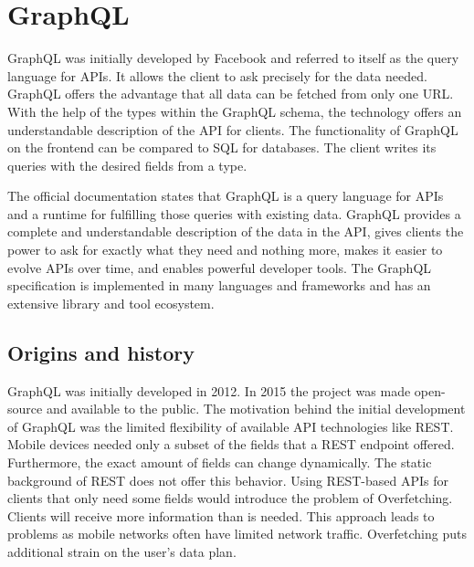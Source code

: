 \section{GraphQL}\label{section:background:graphql}

GraphQL was initially developed by Facebook and referred to itself as the query language for APIs. It allows the client to ask precisely for the data needed. GraphQL offers the advantage that all data can be fetched from only one \ac{URL}. With the help of the types within the GraphQL schema, the technology offers an understandable description of the \ac{API} for clients. \cite{misc:-:background:graphql:graphql-org} The functionality of GraphQL on the frontend can be compared to \ac{SQL} for databases. The client writes its queries with the desired fields from a type.

\bigskip

\noindent The official documentation states that GraphQL is a query language for \acp{API} and a runtime for fulfilling those queries with existing data. GraphQL provides a complete and understandable description of the data in the \ac{API}, gives clients the power to ask for exactly what they need and nothing more, makes it easier to evolve \acp{API} over time, and enables powerful developer tools. The GraphQL specification is implemented in many languages and frameworks and has an extensive library and tool ecosystem.

\subsection{Origins and history}\label{subsection:background:graphql:origins-and-history}

GraphQL was initially developed in 2012. In 2015 the project was made open-source and available to the public. The motivation behind the initial development of GraphQL was the limited flexibility of available \ac{API} technologies like \ac{REST}. Mobile devices needed only a subset of the fields that a \ac{REST} endpoint offered. Furthermore, the exact amount of fields can change dynamically. The static background of \ac{REST} does not offer this behavior. Using \ac{REST}-based \acp{API} for clients that only need some fields would introduce the problem of Overfetching. Clients will receive more information than is needed. This approach leads to problems as mobile networks often have limited network traffic. Overfetching puts additional strain on the user's data plan. \cite{misc:2015:bryon:background:graphql:graphql-query-language}

